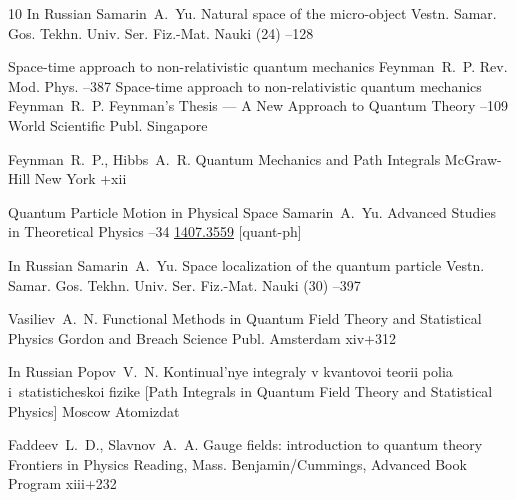 \begin{thebibliography}{10}
\lang In Russian
\by Samarin~A.~Yu.
\paper Natural space of the micro-object
\jour Vestn. Samar. Gos. Tekhn. Univ. Ser. Fiz.-Mat. Nauki
(24)
--128

\paper Space-time approach to non-relativistic quantum mechanics
\by Feynman~R.~P.
\jour Rev. Mod. Phys.
--387
\moreref
\paper Space-time approach to non-relativistic quantum mechanics
\by Feynman~R.~P.
\inbook  Feynman's Thesis — A New Approach to Quantum Theory
--109
\publ World Scientific Publ.
\publaddr Singapore

\by Feynman~R.~P., Hibbs~A.~R.
\book Quantum Mechanics and Path Integrals
\publ McGraw-Hill
\publaddr New York
+xii


\paper Quantum Particle Motion in Physical Space
\by Samarin~A.~Yu.
\jour  Advanced Studies in Theoretical Physics
--34
\arxiv \href{http://arxiv.org/abs/1407.3559}{1407.3559} [quant-ph]


\lang In Russian
\by Samarin~A.~Yu.
\paper Space localization of the quantum particle
\jour Vestn. Samar. Gos. Tekhn. Univ. Ser. Fiz.-Mat. Nauki
(30)
--397

\by Vasiliev~A.~N.
\book Functional Methods in Quantum Field Theory and Statistical Physics 
\publ  Gordon and Breach Science Publ.
\publaddr Amsterdam
\totalpages  xiv+312 

\lang In Russian
\by Popov~V.~N.
\book Kontinual'nye integraly v kvantovoi teorii polia i~statisticheskoi fizike \rm [Path Integrals in Quantum Field Theory and Statistical Physics]
\publaddr  Moscow
\publ Atomizdat

\by Faddeev~L.~D., Slavnov~A.~A.
\book Gauge fields: introduction to quantum theory
\serial Frontiers in Physics
\publaddr  Reading, Mass.
\publ Benjamin/Cummings, Advanced Book Program
\totalpages xiii+232 


\end{thebibliography}
